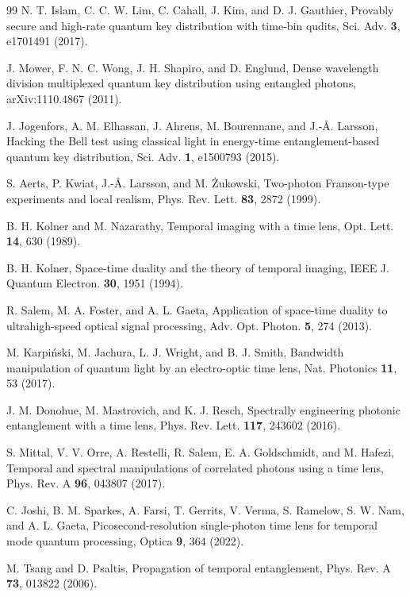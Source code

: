 \documentclass[11pt]{article}
\begin{document}
\begin{thebibliography}{99}
 N. T. Islam, C. C. W. Lim, C. Cahall, J. Kim, and D. J. Gauthier, Provably secure and high-rate quantum key distribution with time-bin qudits, Sci. Adv. \textbf{3}, e1701491 (2017).

 J. Mower, F. N. C. Wong, J. H. Shapiro, and D. Englund, Dense wavelength division multiplexed quantum key distribution using entangled photons, arXiv:1110.4867 (2011).

 J. Jogenfors, A. M. Elhassan, J. Ahrens, M. Bourennane, and J.-\AA. Larsson, Hacking the Bell test using classical light in energy-time entanglement-based quantum key distribution, Sci. Adv. \textbf{1}, e1500793 (2015).

 S. Aerts, P. Kwiat, J.-\AA. Larsson, and M. \.Zukowski, Two-photon Franson-type experiments and local realism, Phys. Rev. Lett. \textbf{83}, 2872 (1999).

 B. H. Kolner and M. Nazarathy, Temporal imaging with a time lens, Opt. Lett. \textbf{14}, 630 (1989).

 B. H. Kolner, Space-time duality and the theory of temporal imaging, IEEE J. Quantum Electron. \textbf{30}, 1951 (1994).

 R. Salem, M. A. Foster, and A. L. Gaeta, Application of space-time duality to ultrahigh-speed optical signal processing, Adv. Opt. Photon. \textbf{5}, 274 (2013).

 M. Karpi\'nski, M. Jachura, L. J. Wright, and B. J. Smith, Bandwidth manipulation of quantum light by an electro-optic time lens, Nat. Photonics \textbf{11}, 53 (2017).

 J. M. Donohue, M. Mastrovich, and K. J. Resch, Spectrally engineering photonic entanglement with a time lens, Phys. Rev. Lett. \textbf{117}, 243602 (2016).

 S. Mittal, V. V. Orre, A. Restelli, R. Salem, E. A. Goldschmidt, and M. Hafezi, Temporal and spectral manipulations of correlated photons using a time lens, Phys. Rev. A \textbf{96}, 043807 (2017).

 C. Joshi, B. M. Sparkes, A. Farsi, T. Gerrits, V. Verma, S. Ramelow, S. W. Nam, and A. L. Gaeta, Picosecond-resolution single-photon time lens for temporal mode quantum processing, Optica \textbf{9}, 364 (2022).

 M. Tsang and D. Psaltis, Propagation of temporal entanglement, Phys. Rev. A \textbf{73}, 013822 (2006).


\end{thebibliography}
\end{document}
